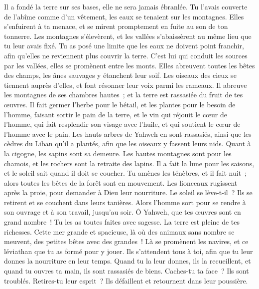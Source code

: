 \begin{multicols}{2}
Il a fondé la terre sur ses bases, elle ne sera jamais ébranlée.
Tu l'avais couverte de l'abîme comme d'un vêtement, les eaux se tenaient sur les montagnes.
Elles s'enfuirent à ta menace, et se mirent promptement en fuite au son de ton tonnerre.
Les montagnes s'élevèrent, et les vallées s'abaissèrent au même lieu que tu leur avais fixé.
Tu as posé une limite que les eaux ne doivent point franchir, afin qu'elles ne reviennent plus couvrir la terre.
C'est lui qui conduit les sources par les vallées, elles se promènent entre les monts.
Elles abreuvent toutes les bêtes des champs, les ânes sauvages y étanchent leur soif.
Les oiseaux des cieux se tiennent auprès d'elles, et font résonner leur voix parmi les rameaux.
Il abreuve les montagnes de ses chambres hautes~; et la terre est rassasiée du fruit de tes œuvres.
Il fait germer l'herbe pour le bétail, et les plantes pour le besoin de l'homme, faisant sortir le pain de la terre,
et le vin qui réjouit le cœur de l'homme, qui fait resplendir son visage avec l'huile, et qui soutient le cœur de l'homme avec le pain.
Les hauts arbres de Yahweh en sont rassasiés, ainsi que les cèdres du Liban qu'il a plantés,
afin que les oiseaux y fassent leurs nids. Quant à la cigogne, les sapins sont sa demeure.
Les hautes montagnes sont pour les chamois, et les rochers sont la retraite des lapins.
Il a fait la lune pour les saisons, et le soleil sait quand il doit se coucher.
Tu amènes les ténèbres, et il fait nuit~; alors toutes les bêtes de la forêt sont en mouvement.
Les lionceaux rugissent après la proie, pour demander à Dieu leur nourriture.
Le soleil se lève-t-il~? Ils se retirent et se couchent dans leurs tanières.
Alors l'homme sort pour se rendre à son ouvrage et à son travail, jusqu'au soir.
Ô Yahweh, que tes œuvres sont en grand nombre~! Tu les as toutes faites avec sagesse. La terre est pleine de tes richesses.
Cette mer grande et spacieuse, là où des animaux sans nombre se meuvent, des petites bêtes avec des grandes~!
Là se promènent les navires, et ce léviathan que tu as formé pour y jouer.
Ils s'attendent tous à toi, afin que tu leur donnes la nourriture en leur temps.
Quand tu la leur donnes, ils la recueillent, et quand tu ouvres ta main, ils sont rassasiés de biens.
Caches-tu ta face~? Ils sont troublés. Retires-tu leur esprit~? Ils défaillent et retournent dans leur poussière.

\end{multicols}
